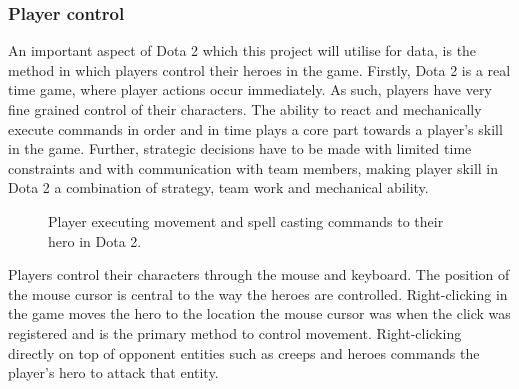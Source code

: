 \documentclass[Report.tex]{subfiles}
\begin{document}
\subsubsection{Player control}\label{sec:dota-control}
An important aspect of Dota 2 which this project will utilise for data, is the method in which players control their heroes in the game. Firstly, Dota 2 is a real time game, where player actions occur immediately. As such, players have very fine grained control of their characters. The ability to react and mechanically execute commands in order and in time plays a core part towards a player's skill in the game. Further, strategic decisions have to be made with limited time constraints and with communication with team members, making player skill in Dota 2 a combination of strategy, team work and mechanical ability. 

\begin{figure}[H]
\begin{subfigure}{0.4\textwidth}
\end{subfigure}
\hspace{\fill}
\begin{subfigure}{0.4\textwidth}
\end{subfigure}
\caption{Player executing movement and spell casting commands to their hero in Dota 2.}
\end{figure}

Players control their characters through the mouse and keyboard. The position of the mouse cursor is central to the way the heroes are controlled. Right-clicking in the game moves the hero to the location the mouse cursor was when the click was registered and is the primary method to control movement. Right-clicking directly on top of opponent entities such as creeps and heroes commands the player's hero to attack that entity. 
\end{document}
